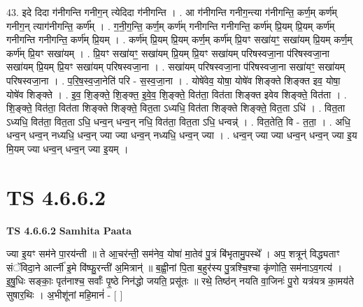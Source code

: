 \documentclass[17pt]{extarticle}
\begin{document}
43. इदे दिदा ग॑नीगन्ति गनीग॒न् त्येदिदा ग॑नीगन्ति । . आ ग॑नीगन्ति गनीग॒न्त्या ग॑नीगन्ति॒ कर्ण॒म् कर्ण॑म् गनीग॒न् त्याग॑नीगन्ति॒ कर्ण᳚म् । . ग॒नी॒ग॒न्ति॒ कर्ण॒म् कर्ण॑म् गनीगन्ति गनीगन्ति॒ कर्ण॑म् प्रि॒यम् प्रि॒यम् कर्ण॑म् गनीगन्ति गनीगन्ति॒ कर्ण॑म् प्रि॒यम् । . कर्ण॑म् प्रि॒यम् प्रि॒यम् कर्ण॒म् कर्ण॑म् प्रि॒यꣳ सखा॑यꣳ॒॒ सखा॑यम् प्रि॒यम् कर्ण॒म् कर्ण॑म् प्रि॒यꣳ सखा॑यम् । . प्रि॒यꣳ सखा॑यꣳ॒॒ सखा॑यम् प्रि॒यम् प्रि॒यꣳ सखा॑यम् परिषस्वजा॒ना प॑रिषस्वजा॒ना सखा॑यम् प्रि॒यम् प्रि॒यꣳ सखा॑यम् परिषस्वजा॒ना । . सखा॑यम् परिषस्वजा॒ना प॑रिषस्वजा॒ना सखा॑यꣳ॒॒ सखा॑यम् परिषस्वजा॒ना । . प॒रि॒ष॒स्व॒जा॒नेति॑ परि - स॒स्व॒जा॒ना । . योषे॑वेव॒ योषा॒ योषे॑व शिङ्क्ते शिङ्क्त इव॒ योषा॒ योषे॑व शिङ्क्ते । . इ॒व॒ शि॒ङ्क्ते॒ शि॒ङ्क्त॒ इ॒वे॒व॒ शि॒ङ्क्ते॒ वित॑ता॒ वित॑ता शिङ्क्त इवेव शिङ्क्ते॒ वित॑ता । . शि॒ङ्क्ते॒ वित॑ता॒ वित॑ता शिङ्क्ते शिङ्क्ते॒ वित॒ता ऽध्यधि॒ वित॑ता शिङ्क्ते शिङ्क्ते॒ वित॒ता ऽधि॑ । . वित॒ता ऽध्यधि॒ वित॑ता॒ वित॒ता ऽधि॒ धन्व॒न् धन्व॒न् नधि॒ वित॑ता॒ वित॒ता ऽधि॒ धन्वन्न्॑ । . वित॒तेति॒ वि - त॒ता॒ । . अधि॒ धन्व॒न् धन्व॒न् नध्यधि॒ धन्व॒न् ज्या ज्या धन्व॒न् नध्यधि॒ धन्व॒न् ज्या । . धन्व॒न् ज्या ज्या धन्व॒न् धन्व॒न् ज्या इ॒य मि॒यम् ज्या धन्व॒न् धन्व॒न् ज्या इ॒यम् । \newline
\pagebreak
{}

\section{ TS 4.6.6.2 }

\textbf{TS 4.6.6.2 } \newline
\textbf{Samhita Paata} \newline

ज्या इ॒यꣳ सम॑ने पा॒रय॑न्ती ॥ ते आ॒चर॑न्ती॒ सम॑नेव॒ योषा॑ मा॒तेव॑ पु॒त्रं बि॑भृतामु॒पस्थे᳚ । अप॒ शत्रून्॑ विद्ध्यताꣳ संॅविदा॒ने आर्त्नी॑ इ॒मे वि॑ष्फु॒रन्ती॑ अ॒मित्रान्॑ ॥ ब॒ह्वी॒नां पि॒ता ब॒हुर॑स्य पु॒त्रश्चि॒श्चा कृ॑णोति॒ सम॑नाऽव॒गत्य॑ । इ॒षु॒धिः सङ्काः॒ पृत॑नाश्च॒ सर्वाः᳚ पृ॒ष्ठे निन॑द्धो जयति॒ प्रसू॑तः ॥ रथे॒ तिष्ठ॑न् नयति वा॒जिनः॑ पु॒रो यत्र॑यत्र का॒मय॑ते सुषार॒थिः । अ॒भीशू॑नां महि॒मानं॑ - [  ] \newline
\end{document}
